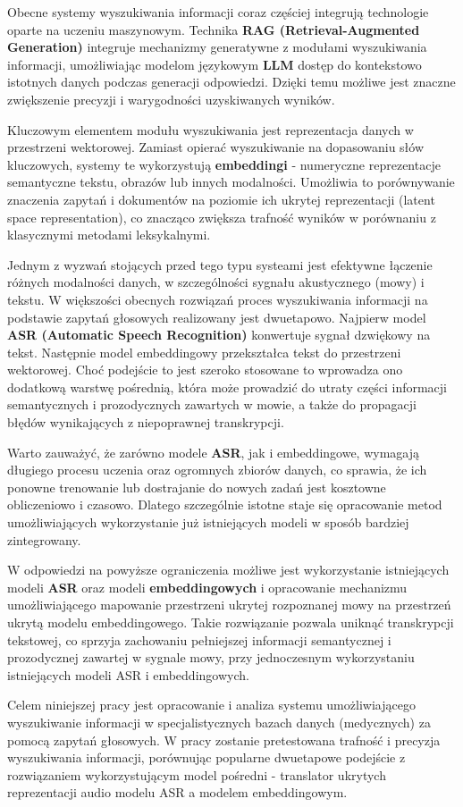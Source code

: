 
% 

Obecne systemy wyszukiwania informacji coraz częściej integrują technologie oparte na uczeniu maszynowym. Technika \textbf{RAG (Retrieval-Augmented Generation)} integruje mechanizmy generatywne z modułami wyszukiwania informacji, umożliwiając modelom językowym \textbf{LLM} dostęp do kontekstowo istotnych danych podczas generacji odpowiedzi. Dzięki temu możliwe jest znaczne zwiększenie precyzji i warygodności uzyskiwanych wyników. 

Kluczowym elementem modułu wyszukiwania jest reprezentacja danych w przestrzeni wektorowej. Zamiast opierać wyszukiwanie na dopasowaniu słów kluczowych, systemy te wykorzystują \textbf{embeddingi} - numeryczne reprezentacje semantyczne tekstu, obrazów lub innych modalności. Umożliwia to porównywanie znaczenia zapytań i dokumentów na poziomie ich ukrytej reprezentacji (latent space representation), co znacząco zwiększa trafność wyników w porównaniu z klasycznymi metodami leksykalnymi.

Jednym z wyzwań stojących przed tego typu systeami jest efektywne łączenie różnych modalności danych, w szczególności sygnału akustycznego (mowy) i tekstu. W większości obecnych rozwiązań proces wyszukiwania informacji na podstawie zapytań głosowych realizowany jest dwuetapowo. Najpierw model \textbf{ASR (Automatic Speech Recognition)} konwertuje sygnał dzwiękowy na tekst. Następnie model embeddingowy przekształca tekst do przestrzeni wektorowej. Choć podejście to jest szeroko stosowane to wprowadza ono dodatkową warstwę pośrednią, która może prowadzić do utraty części informacji semantycznych i prozodycznych zawartych w mowie, a także do propagacji błędów wynikających z niepoprawnej transkrypcji.

Warto zauważyć, że zarówno modele \textbf{ASR}, jak i embeddingowe, wymagają długiego procesu uczenia oraz ogromnych zbiorów danych, co sprawia, że ich ponowne trenowanie lub dostrajanie do nowych zadań jest kosztowne obliczeniowo i czasowo. Dlatego szczególnie istotne staje się opracowanie metod umożliwiających wykorzystanie już istniejących modeli w sposób bardziej zintegrowany.

W odpowiedzi na powyższe ograniczenia możliwe jest wykorzystanie istniejących modeli \textbf{ASR} oraz modeli \textbf{embeddingowych} i opracowanie mechanizmu umożliwiającego mapowanie przestrzeni ukrytej rozpoznanej mowy na przestrzeń ukrytą modelu embeddingowego. Takie rozwiązanie pozwala uniknąć transkrypcji tekstowej, co sprzyja zachowaniu pełniejszej informacji semantycznej i prozodycznej zawartej w sygnale mowy, przy jednoczesnym wykorzystaniu istniejących modeli ASR i embeddingowych.

Celem niniejszej pracy jest opracowanie i analiza systemu umożliwiającego wyszukiwanie informacji w specjalistycznych bazach danych (medycznych) za pomocą zapytań głosowych. W pracy zostanie pretestowana trafność i precyzja wyszukiwania informacji, porównując popularne dwuetapowe podejście z rozwiązaniem wykorzystującym model pośredni - translator ukrytych reprezentacji audio modelu ASR a modelem embeddingowym.